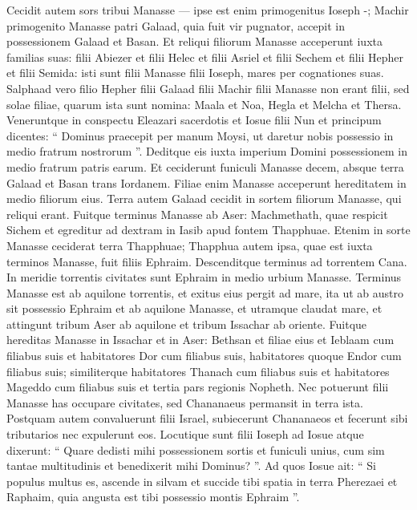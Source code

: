 \begin{biblechapter}
\begin{biblechapter}
\begin{biblechapter}
\begin{biblechapter}
\begin{biblechapter}
\begin{biblechapter}
\begin{biblechapter}
\begin{biblechapter}
\begin{biblechapter}
\begin{biblechapter}
\begin{biblechapter}
\begin{biblechapter}
\begin{biblechapter}
\begin{biblechapter}
\begin{biblechapter}
\begin{biblechapter}
\begin{biblechapter}
\verse Cecidit autem sors tribui Manasse — ipse est enim primogenitus Ioseph -; Machir primogenito Manasse patri Galaad, quia fuit vir pugnator, accepit in possessionem Galaad et Basan. 
\verse Et reliqui filiorum Manasse acceperunt iuxta familias suas: filii Abiezer et filii Helec et filii Asriel et filii Sechem et filii Hepher et filii Semida: isti sunt filii Manasse filii Ioseph, mares per cognationes suas. 
\verse Salphaad vero filio Hepher filii Galaad filii Machir filii Manasse non erant filii, sed solae filiae, quarum ista sunt nomina: Maala et Noa, Hegla et Melcha et Thersa. 
\verse Veneruntque in conspectu Eleazari sacerdotis et Iosue filii Nun et principum dicentes: “ Dominus praecepit per manum Moysi, ut daretur nobis possessio in medio fratrum nostrorum ”. Deditque eis iuxta imperium Domini possessionem in medio fratrum patris earum. 
\verse Et ceciderunt funiculi Manasse decem, absque terra Galaad et Basan trans Iordanem. 
 \verse Filiae enim Manasse acceperunt hereditatem in medio filiorum eius. Terra autem Galaad cecidit in sortem filiorum Manasse, qui reliqui erant.
 \verse Fuitque terminus Manasse ab Aser: Machmethath, quae respicit Sichem et egreditur ad dextram in Iasib apud fontem Thapphuae. 
\verse Etenim in sorte Manasse ceciderat terra Thapphuae; Thapphua autem ipsa, quae est iuxta terminos Manasse, fuit filiis Ephraim. 
\verse Descenditque terminus ad torrentem Cana. In meridie torrentis civitates sunt Ephraim in medio urbium Manasse. Terminus Manasse est ab aquilone torrentis, et exitus eius pergit ad mare, 
\verse ita ut ab austro sit possessio Ephraim et ab aquilone Manasse, et utramque claudat mare, et attingunt tribum Aser ab aquilone et tribum Issachar ab oriente. 
\verse Fuitque hereditas Manasse in Issachar et in Aser: Bethsan et filiae eius et Ieblaam cum filiabus suis et habitatores Dor cum filiabus suis, habitatores quoque Endor cum filiabus suis; similiterque habitatores Thanach cum filiabus suis et habitatores Mageddo cum filiabus suis et tertia pars regionis Nopheth. 
 \verse Nec potuerunt filii Manasse has occupare civitates, sed Chananaeus permansit in terra ista. 
\verse Postquam autem convaluerunt filii Israel, subiecerunt Chananaeos et fecerunt sibi tributarios nec expulerunt eos.
 \verse Locutique sunt filii Ioseph ad Iosue atque dixerunt: “ Quare dedisti mihi possessionem sortis et funiculi unius, cum sim tantae multitudinis et benedixerit mihi Dominus? ”. 
\verse Ad quos Iosue ait: “ Si populus multus es, ascende in silvam et succide tibi spatia in terra Pherezaei et Raphaim, quia angusta est tibi possessio montis Ephraim ”. 

\end{biblechapter}
\end{biblechapter}
\end{biblechapter}
\end{biblechapter}
\end{biblechapter}
\end{biblechapter}
\end{biblechapter}
\end{biblechapter}
\end{biblechapter}
\end{biblechapter}
\end{biblechapter}
\end{biblechapter}
\end{biblechapter}
\end{biblechapter}
\end{biblechapter}
\end{biblechapter}
\end{biblechapter}
